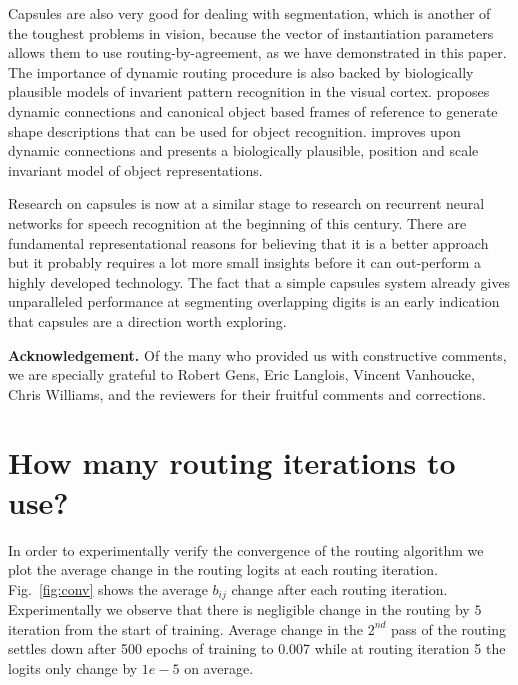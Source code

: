 \documentclass{article}
\begin{document}
Capsules are also very good for dealing with segmentation, which is another of the toughest problems in vision, because the vector of instantiation parameters allows them to use routing-by-agreement, as we have demonstrated in this paper. The importance of dynamic routing procedure is also backed by biologically plausible models of invarient pattern recognition in the visual cortex. \cite{hinton1981parallel} proposes dynamic connections and canonical object based frames of reference to generate shape descriptions that can be used for object recognition. \cite{olshausen1993neurobiological} improves upon \cite{hinton1981parallel} dynamic connections and presents a biologically plausible, position and scale invariant model of object representations. 

Research on capsules is now at a similar stage to research on recurrent neural networks for speech recognition at the beginning of this century. There are fundamental representational reasons for believing that it is a better approach but it probably requires a lot more small insights before it can out-perform a highly developed technology.  The fact that a simple capsules system already gives unparalleled performance at segmenting overlapping digits is an early indication that capsules are a direction worth exploring. 

{\bf Acknowledgement.} Of the many who provided us with constructive comments, we are specially grateful to Robert Gens, Eric Langlois, Vincent Vanhoucke, Chris Williams, and the reviewers for their fruitful comments and corrections.
\newpage




\appendix
\renewcommand\thefigure{\thesection.\arabic{figure}}   
\setcounter{figure}{0}  
\section{How many routing iterations to use?}

 In order to experimentally verify the convergence of the routing algorithm we plot the average change in the routing logits at each routing iteration. Fig.~\ref{fig:conv} shows the average $b_{ij}$ change after each routing iteration. Experimentally we observe that there is negligible change in the routing by $5$ iteration from the start of training. Average change in the $2^{nd}$ pass of the routing settles down after 500 epochs of training to 0.007 while at routing iteration 5 the logits only change by $1e-5$ on average.
\end{document}
